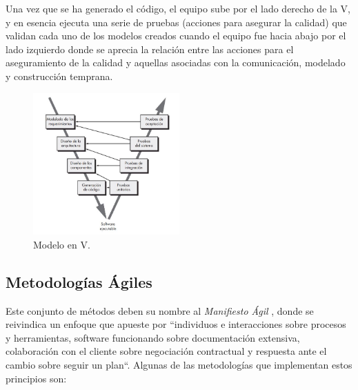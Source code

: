 \begin{itemize}
        Una vez que se ha generado el código, el equipo sube por el lado derecho de la V, y en esencia ejecuta una serie de pruebas (acciones para asegurar la calidad) que validan cada uno de los modelos creados cuando el equipo fue hacia abajo por el lado izquierdo donde se aprecia la relación entre las acciones para  el aseguramiento de la calidad y aquellas asociadas con la comunicación, modelado y construcción temprana. 
    
        \begin{figure}[h]
            \centering
            \includegraphics[width=0.5\textwidth]{figures/en v.JPG}
            \caption[Modelo en V, extraído de \cite{pressman_software_2005}]{Modelo en V.}
            \label{fig:metodologia:modelo_v}
        \end{figure}
    \end{itemize}

    \subsection{Metodologías Ágiles}

        Este conjunto de métodos deben su nombre al \textit{Manifiesto Ágil} \cite{varios_autores_manifiesto_2001}, donde se reivindica un enfoque que apueste por ``individuos e interacciones sobre procesos y herramientas, software funcionando sobre documentación extensiva, colaboración con el cliente sobre negociación contractual y respuesta ante el cambio sobre seguir un plan``. Algunas de las metodologías que implementan estos principios son:
    
